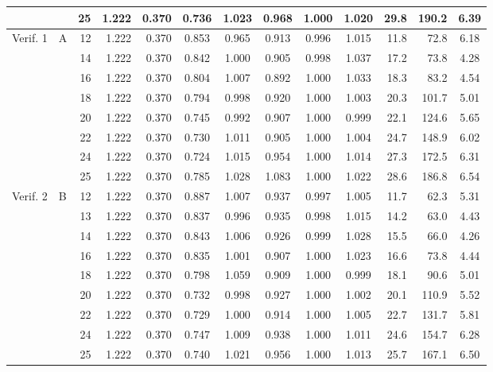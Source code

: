 \begin{table}[htbp]
\begin{adjustbox}{max width=\textwidth}
\begin{tabular}{@{}llr*{2}{r}*{5}{c}rrc@{}}
         &  & 25 & 1.222 & 0.370 & 0.736 & 1.023 & 0.968 & 1.000 & 1.020 & 29.8 & 190.2 & 6.39 \\
        \midrule
        Verif. 1 & A & 12 & 1.222 & 0.370 & 0.853 & 0.965 & 0.913 & 0.996 & 1.015 & 11.8 & 72.8 & 6.18 \\
         &  & 14 & 1.222 & 0.370 & 0.842 & 1.000 & 0.905 & 0.998 & 1.037 & 17.2 & 73.8 & 4.28 \\
         &  & 16 & 1.222 & 0.370 & 0.804 & 1.007 & 0.892 & 1.000 & 1.033 & 18.3 & 83.2 & 4.54 \\
         &  & 18 & 1.222 & 0.370 & 0.794 & 0.998 & 0.920 & 1.000 & 1.003 & 20.3 & 101.7 & 5.01 \\
         &  & 20 & 1.222 & 0.370 & 0.745 & 0.992 & 0.907 & 1.000 & 0.999 & 22.1 & 124.6 & 5.65 \\
         &  & 22 & 1.222 & 0.370 & 0.730 & 1.011 & 0.905 & 1.000 & 1.004 & 24.7 & 148.9 & 6.02 \\
         &  & 24 & 1.222 & 0.370 & 0.724 & 1.015 & 0.954 & 1.000 & 1.014 & 27.3 & 172.5 & 6.31 \\
         &  & 25 & 1.222 & 0.370 & 0.785 & 1.028 & 1.083 & 1.000 & 1.022 & 28.6 & 186.8 & 6.54 \\
        \midrule
        Verif. 2 & B & 12 & 1.222 & 0.370 & 0.887 & 1.007 & 0.937 & 0.997 & 1.005 & 11.7 & 62.3 & 5.31 \\
         &  & 13 & 1.222 & 0.370 & 0.837 & 0.996 & 0.935 & 0.998 & 1.015 & 14.2 & 63.0 & 4.43 \\
         &  & 14 & 1.222 & 0.370 & 0.843 & 1.006 & 0.926 & 0.999 & 1.028 & 15.5 & 66.0 & 4.26 \\
         &  & 16 & 1.222 & 0.370 & 0.835 & 1.001 & 0.907 & 1.000 & 1.023 & 16.6 & 73.8 & 4.44 \\
         &  & 18 & 1.222 & 0.370 & 0.798 & 1.059 & 0.909 & 1.000 & 0.999 & 18.1 & 90.6 & 5.01 \\
         &  & 20 & 1.222 & 0.370 & 0.732 & 0.998 & 0.927 & 1.000 & 1.002 & 20.1 & 110.9 & 5.52 \\
         &  & 22 & 1.222 & 0.370 & 0.729 & 1.000 & 0.914 & 1.000 & 1.005 & 22.7 & 131.7 & 5.81 \\
         &  & 24 & 1.222 & 0.370 & 0.747 & 1.009 & 0.938 & 1.000 & 1.011 & 24.6 & 154.7 & 6.28 \\
         &  & 25 & 1.222 & 0.370 & 0.740 & 1.021 & 0.956 & 1.000 & 1.013 & 25.7 & 167.1 & 6.50 \\
        \bottomrule
    \end{tabular}
    \end{adjustbox}
\end{table}

